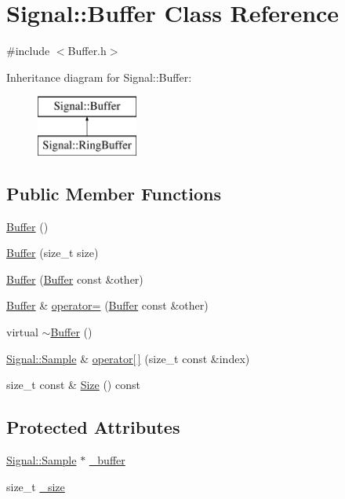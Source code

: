\hypertarget{class_signal_1_1_buffer}{\section{Signal\+:\+:Buffer Class Reference}
\label{class_signal_1_1_buffer}
}


{\ttfamily \#include $<$Buffer.\+h$>$}

Inheritance diagram for Signal\+:\+:Buffer\+:\begin{figure}[H]
\begin{center}
\leavevmode
\includegraphics[height=2.000000cm]{class_signal_1_1_buffer}
\end{center}
\end{figure}
\subsection*{Public Member Functions}
\begin{DoxyCompactItemize}
\item 
\hyperlink{class_signal_1_1_buffer_ab558e80dac4ef396b9c9310fd914936f}{Buffer} ()
\item 
\hyperlink{class_signal_1_1_buffer_a002c329b3f2b4eaa388b27cc0796f68f}{Buffer} (size\+\_\+t size)
\item 
\hyperlink{class_signal_1_1_buffer_a89a0e919b2aa5f46f2c44137443128fc}{Buffer} (\hyperlink{class_signal_1_1_buffer}{Buffer} const \&other)
\item 
\hyperlink{class_signal_1_1_buffer}{Buffer} \& \hyperlink{class_signal_1_1_buffer_a9f9f08e2cdf35d15164997455303a2d9}{operator=} (\hyperlink{class_signal_1_1_buffer}{Buffer} const \&other)
\item 
virtual \hyperlink{class_signal_1_1_buffer_aa0a51349fdc5b8d41183e7971e8e799b}{$\sim$\+Buffer} ()
\item 
\hyperlink{class_signal_1_1_sample}{Signal\+::\+Sample} \& \hyperlink{class_signal_1_1_buffer_a0b4ced776c42720b214f6054fa21547a}{operator\mbox{[}$\,$\mbox{]}} (size\+\_\+t const \&index)
\item 
size\+\_\+t const \& \hyperlink{class_signal_1_1_buffer_ad0350078d641ed5cb15a9401d9d20ffe}{Size} () const 
\end{DoxyCompactItemize}
\subsection*{Protected Attributes}
\begin{DoxyCompactItemize}
\item 
\hyperlink{class_signal_1_1_sample}{Signal\+::\+Sample} $\ast$ \hyperlink{class_signal_1_1_buffer_ae88831d6fdf8fd7591d5dd7f79531d5f}{\+\_\+buffer}
\item 
size\+\_\+t \hyperlink{class_signal_1_1_buffer_ab4c8969e972323306ee51538ad70577b}{\+\_\+size}
\end{DoxyCompactItemize}


